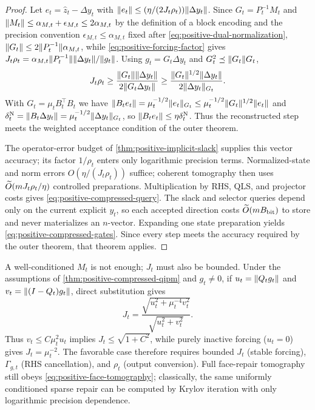 \begin{proof}
Let $e_t=\widehat z_t-\Delta y_t$ with
$\lVert e_t\rVert\le(\eta/(2J_t\rho_t))\lVert\Delta y_t\rVert$.  Since
$G_t=P_t^{-1}M_t$ and
$\lVert M_t\rVert\le\alpha_{M,t}+\epsilon_{M,t}\le2\alpha_{M,t}$ by the
definition of a block encoding and the precision convention
$\epsilon_{M,t}\le\alpha_{M,t}$ fixed after
\eqref{eq:positive-dual-normalization},
$\lVert G_t\rVert\le2\lVert P_t^{-1}\rVert\alpha_{M,t}$, while
\eqref{eq:positive-forcing-factor} gives
$J_t\rho_t=\alpha_{M,t}\lVert P_t^{-1}\rVert\lVert\Delta y_t\rVert/\lVert g_t\rVert$.
Using $g_t=G_t\Delta y_t$ and $G_t^2\preceq\lVert G_t\rVert G_t$,
\[
 J_t\rho_t
 \ge\frac{\lVert G_t\rVert\lVert\Delta y_t\rVert}
          {2\lVert G_t\Delta y_t\rVert}
 \ge\frac{\lVert G_t\rVert^{1/2}\lVert\Delta y_t\rVert}
          {2\lVert\Delta y_t\rVert_{G_t}}.
\]
With $G_t=\mu_tB_t^\top B_t$ we have
$\lVert B_te_t\rVert=\mu_t^{-1/2}\lVert e_t\rVert_{G_t}
\le \mu_t^{-1/2}\lVert G_t\rVert^{1/2}\lVert e_t\rVert$ and
$\delta^{\rm N}_t=\lVert B_t\Delta y_t\rVert
=\mu_t^{-1/2}\lVert\Delta y_t\rVert_{G_t}$, so
$\lVert B_te_t\rVert\le\eta\delta^{\rm N}_t$.  Thus the reconstructed step
meets the weighted acceptance condition of the outer theorem.

The operator-error budget of \cref{thm:positive-implicit-slack} supplies this
vector accuracy; its factor $1/\rho_t$ enters only logarithmic precision
terms.  Normalized-state and norm errors $O(\eta/(J_t\rho_t))$ suffice;
coherent tomography then uses $\widetilde{O}(mJ_t\rho_t/\eta)$ controlled
preparations.  Multiplication by RHS,
QLS, and projector costs gives \eqref{eq:positive-compressed-query}.  The
slack and selector queries depend only on the current explicit $y_t$, so each
accepted direction costs $\widetilde{O}(mB_{\rm bit})$ to store and never materializes an
$n$-vector.  Expanding one state preparation yields
\eqref{eq:positive-compressed-gates}.  Since every step meets the accuracy
required by the outer theorem, that theorem applies.
\end{proof}

A well-conditioned $M_t$ is not enough; $J_t$ must also be bounded.  Under
the assumptions of \cref{thm:positive-compressed-qipm} and $g_t\ne0$, if
$u_t=\lVert Q_tg_t\rVert$ and $v_t=\lVert(I-Q_t)g_t\rVert$, direct substitution gives
\begin{equation}
 J_t=\frac{\sqrt{u_t^2+\mu_t^{-4}v_t^2}}{\sqrt{u_t^2+v_t^2}}.    \label{eq:positive-forcing-dichotomy}
\end{equation}
Thus $v_t\leq C\mu_t^2u_t$ implies $J_t\leq\sqrt{1+C^2}$, while purely
inactive forcing ($u_t=0$) gives
$J_t=\mu_t^{-2}$.  The favorable case therefore requires bounded
$J_t$ (stable forcing), $\Gamma_{g,t}$ (RHS cancellation), and $\rho_t$
(output conversion).  Full face-repair tomography still obeys
\eqref{eq:positive-face-tomography}; classically, the same uniformly
conditioned sparse repair can be computed by Krylov iteration with only
logarithmic precision dependence.

